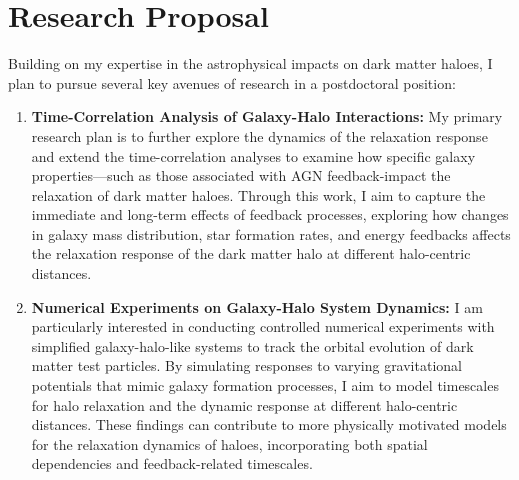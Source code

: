 \documentclass[11pt]{article}
\begin{document}
\section{Research Proposal}
Building on my expertise in the astrophysical impacts on dark matter haloes, I plan to pursue several key avenues of research in a postdoctoral position:

\begin{enumerate}
    \item \textbf{Time-Correlation Analysis of Galaxy-Halo Interactions:} My primary research plan is to further explore the dynamics of the relaxation response and extend the time-correlation analyses to examine how specific galaxy properties—such as those associated with AGN feedback-impact the relaxation of dark matter haloes. Through this work, I aim to capture the immediate and long-term effects of feedback processes, exploring how changes in galaxy mass distribution, star formation rates, and energy feedbacks affects the relaxation response of the dark matter halo at different halo-centric distances.

    \item \textbf{Numerical Experiments on Galaxy-Halo System Dynamics:} I am particularly interested in conducting controlled numerical experiments with simplified galaxy-halo-like systems to track the orbital evolution of dark matter test particles. By simulating responses to varying gravitational potentials that mimic galaxy formation processes, I aim to model timescales for halo relaxation and the dynamic response at different halo-centric distances. These findings can contribute to more physically motivated models for the relaxation dynamics of haloes, incorporating both spatial dependencies and feedback-related timescales.



\end{enumerate}
\end{document}
